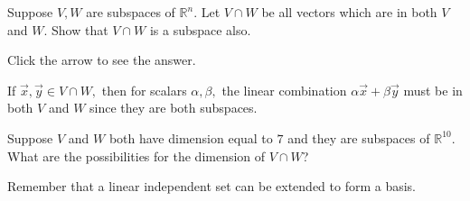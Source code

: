 \documentclass{ximera}
\begin{document}
\begin{problem}\label{prb:5.27} Suppose $V, W$ are subspaces of $\mathbb{R}^{n}.$ Let $V\cap W$
be all vectors which are in both $V$ and $W$. Show that $V \cap W$ is a subspace also.

Click the arrow to see the answer.  
\begin{expandable}
If $\vec{x}, \vec{y}\in V\cap W,$ then for scalars $\alpha
,\beta ,$ the linear combination $\alpha \vec{x}+\beta \vec{y}$ must
be in both $V$ and $W$ since they are both subspaces.
\end{expandable}
\end{problem}

\begin{problem}\label{prb:5.28} Suppose $V$ and $W$ both have dimension equal to $7$ and they are
subspaces of $\mathbb{R}^{10}.$ What are the possibilities for the dimension
of $V\cap W$? 

\begin{hint}
Remember that a linear independent set can be extended to form a basis.
\end{hint}
\end{problem}
\end{document}
